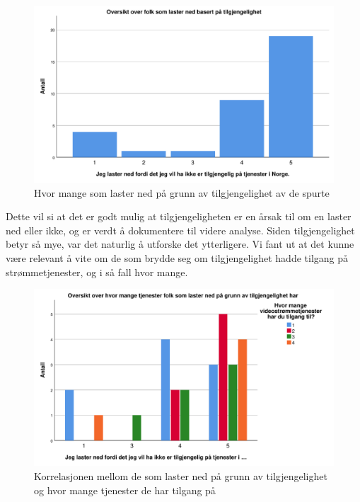 \begin{figure}[H]
    \centering
    \includegraphics[scale=0.45]{case_1/bilder/tilgjengelighet.pdf}
    \caption[Laster ned pga tilgjengelighet]{Hvor mange som laster ned på grunn av tilgjengelighet av de spurte}
    \label{fig:case1-tilgjengelighet}
\end{figure}

Dette vil si at det er godt mulig at tilgjengeligheten er en årsak til om en laster ned eller ikke, og er verdt å dokumentere til videre analyse. Siden tilgjengelighet betyr så mye, var det naturlig å utforske det ytterligere. Vi fant ut at det kunne være relevant å vite om de som brydde seg om tilgjengelighet hadde tilgang på strømmetjenester, og i så fall hvor mange.

\begin{figure}[H]
    \centering
    \includegraphics[scale=0.45]{case_1/bilder/tilgjengelighet_antallstromming.pdf}
    \caption[Tilgjengelighet mot antall strømmetjenester]{Korrelasjonen mellom de som laster ned på grunn av tilgjengelighet og hvor mange tjenester de har tilgang på}
    \label{fig:case1-tilgjengelighet_antallstromming}
\end{figure}

